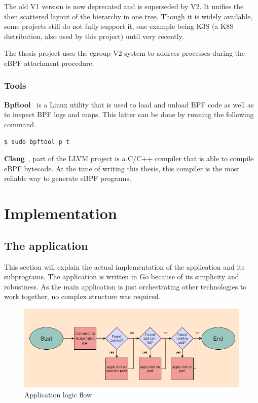 The old V1 version is now deprecated and is superseded by V2. It unifies the then scattered layout of the hierarchy in one \underline{\gls{tree}}. Though it is widely available, some projects still do not fully support it, one example being K3S (a K8S distribution, also used by this project) until very recently.

The thesis project uses the cgroup V2 system to address processes during the eBPF attachment procedure.

\subsubsection{Tools}
\textbf{Bpftool}~\cite{bpftool} is a Linux utility that is used to load and unload BPF code as well as to inspect BPF logs and maps. This latter can be done by running the following command.
\begin{verbatim}
$ sudo bpftool p t
\end{verbatim}

\textbf{Clang}~\cite{clang}, part of the LLVM project is a C/C++ compiler that is able to compile eBPF bytecode. At the time of writing this thesis, this compiler is the most reliable way to generate eBPF programs.

\newpage
\section{Implementation}
\subsection{The application}
This section will explain the actual implementation of the application and its subprograms. The application is written in Go because of its simplicity and robustness. As the main application is just orchestrating other technologies to work together, no complex structure was required.

\begin{figure}[H]
	\centering
	\includegraphics[width=\textwidth]{images/loading.png}
	\caption{Application logic flow}
	\label{fig:app-flow}
\end{figure}

